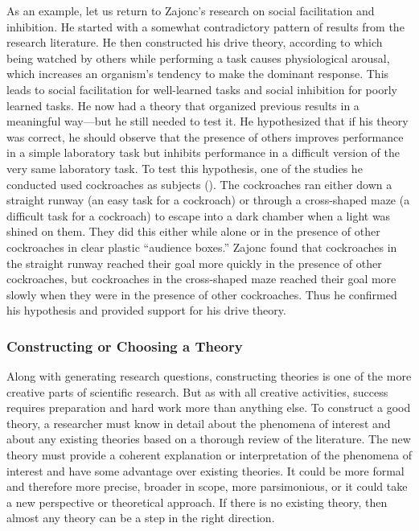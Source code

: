 \documentclass[
]{krantz}
\begin{document}
As an example, let us return to Zajonc's research on social facilitation and inhibition. He started with a somewhat contradictory pattern of results from the research literature. He then constructed his drive theory, according to which being watched by others while performing a task causes physiological arousal, which increases an organism's tendency to make the dominant response. This leads to social facilitation for well-learned tasks and social inhibition for poorly learned tasks. He now had a theory that organized previous results in a meaningful way---but he still needed to test it. He hypothesized that if his theory was correct, he should observe that the presence of others improves performance in a simple laboratory task but inhibits performance in a difficult version of the very same laboratory task. To test this hypothesis, one of the studies he conducted used cockroaches as subjects (). The cockroaches ran either down a straight runway (an easy task for a cockroach) or through a cross-shaped maze (a difficult task for a cockroach) to escape into a dark chamber when a light was shined on them. They did this either while alone or in the presence of other cockroaches in clear plastic ``audience boxes.'' Zajonc found that cockroaches in the straight runway reached their goal more quickly in the presence of other cockroaches, but cockroaches in the cross-shaped maze reached their goal more slowly when they were in the presence of other cockroaches. Thus he confirmed his hypothesis and provided support for his drive theory.

\subsubsection*{Constructing or Choosing a Theory}\label{constructing-or-choosing-a-theory}


Along with generating research questions, constructing theories is one of the more creative parts of scientific research. But as with all creative activities, success requires preparation and hard work more than anything else. To construct a good theory, a researcher must know in detail about the phenomena of interest and about any existing theories based on a thorough review of the literature. The new theory must provide a coherent explanation or interpretation of the phenomena of interest and have some advantage over existing theories. It could be more formal and therefore more precise, broader in scope, more parsimonious, or it could take a new perspective or theoretical approach. If there is no existing theory, then almost any theory can be a step in the right direction.
\end{document}
